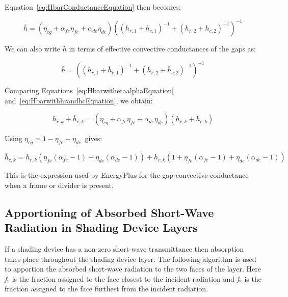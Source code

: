 Equation~\ref{eq:HbarConductanceEquation} then becomes:

\begin{equation}
\overline h  = \left( {{\eta_{cg}} + {\alpha_{fe}}{\eta_{fe}} + {\alpha_{de}}{\eta_{de}}} \right){\left( {{{\left( {{h_{r,1}} + {h_{c,1}}} \right)}^{ - 1}} + {{\left( {{h_{r,2}} + {h_{c,2}}} \right)}^{ - 1}}} \right)^{ - 1}}
\label{eq:HbarwithetaalphaEquation}
\end{equation}

We can also write \(\overline h\) in terms of effective convective conductances of the gaps as:

\begin{equation}
\overline h  = {\left( {{{\left( {{h_{r,1}} + {{\overline h }_{c,1}}} \right)}^{ - 1}} + {{\left( {{h_{r,2}} + {{\overline h }_{c,2}}} \right)}^{ - 1}}} \right)^{ - 1}}
\label{eq:HbarwithhrandhcEquation}
\end{equation}

Comparing Equations~\ref{eq:HbarwithetaalphaEquation} and~\ref{eq:HbarwithhrandhcEquation}, we obtain:

\begin{equation}
{h_{r,k}} + {\overline h_{c,k}} = \left( {{\eta_{cg}} + {\alpha_{fe}}{\eta_{fe}} + {\alpha_{de}}{\eta_{de}}} \right)\left( {{h_{r,k}} + {h_{c,k}}} \right)
\end{equation}

Using \({\eta_{cg}} = 1 - {\eta_{fe}} - {\eta_{de}}\)~gives:

\begin{equation}
{\overline h_{c,k}} = {h_{r,k}}\left( {{\eta_{fe}}\left( {{\alpha_{fe}} - 1} \right) + {\eta_{de}}\left( {{\alpha_{de}} - 1} \right)} \right) + {h_{c,k}}\left( {1 + {\eta_{fe}}\left( {{\alpha_{fe}} - 1} \right) + {\eta_{de}}\left( {{\alpha_{de}} - 1} \right)} \right)
\end{equation}

This is the expression used by EnergyPlus for the gap convective conductance when a frame or divider is present.

\subsection{Apportioning of Absorbed Short-Wave Radiation in Shading Device Layers}\label{apportioning-of-absorbed-short-wave-radiation-in-shading-device-layers}

If a shading device has a non-zero short-wave transmittance then absorption takes place throughout the shading device layer. The following algorithm is used to apportion the absorbed short-wave radiation to the two faces of the layer. Here \emph{f\(_{1}\)} is the fraction assigned to the face closest to the incident radiation and \emph{f\(_{2}\)} is the fraction assigned to the face furthest from the incident radiation.

